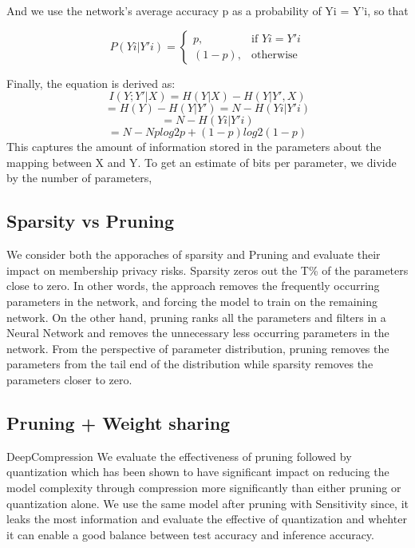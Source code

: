 And we use the network’s average accuracy p as a probability of Yi = Y'i, so that

\[
    P(Yi|Y'i)=
\begin{cases}
    p, & \text{if } Yi =Y'i\\
    (1 - p),  & \text{otherwise}
\end{cases}
\]

Finally, the equation is derived as:
\begin{equation}
I(Y;Y'|X)= H ( Y | X ) - H ( Y | Y' , X )
\end{equation}
\begin{equation}
= H ( Y ) - H ( Y | Y' ) = N -   H ( Y i | Y' i )
\end{equation}
\begin{equation}
= N -   H ( Y i | Y' i )
\end{equation}
\begin{equation}
=N-N plog2 p+(1-p)log2 (1-p)
\end{equation}
This captures
the amount of information stored in the parameters about the mapping between X and Y. To get an estimate of bits per parameter, we divide by the number of parameters,

\subsection{Sparsity vs Pruning}

We consider both the apporaches of sparsity and Pruning and evaluate their impact on membership privacy risks.
Sparsity zeros out the T\% of the parameters close to zero. In other words, the approach removes the frequently occurring parameters in the network, and forcing the model to train on the remaining network.
On the other hand, pruning ranks all the parameters and filters in a Neural Network and removes the unnecessary less occurring parameters in the network.
From the perspective of parameter distribution, pruning removes the parameters from the tail end of the distribution while sparsity removes the parameters closer to zero.






\subsection{Pruning + Weight sharing}
DeepCompression
We evaluate the effectiveness of pruning followed by quantization which has been shown to have significant impact on reducing the model complexity through compression more significantly than either pruning or quantization alone.
We use the same model after pruning with Sensitivity since, it leaks the most information and evaluate the effective of quantization and whehter it can enable a good balance between test accuracy and inference accuracy.



